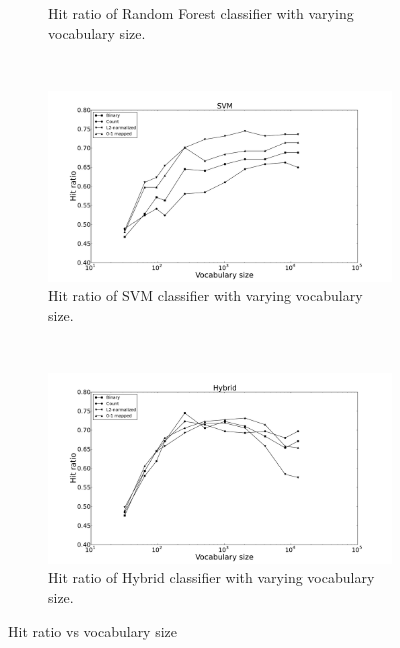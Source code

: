 \begin{figure}[H]
\begin{subfigure}[b]{\figwidth}
		\caption{Hit ratio of Random Forest classifier with varying vocabulary size.}
		\label{fig:hitratio-rf}
	\end{subfigure}
	~
	\begin{subfigure}[b]{\figwidth}
		\includegraphics[width=\textwidth]{img/SVM-hitrate-eps-converted-to.pdf}
		\caption{Hit ratio of SVM classifier with varying vocabulary size.}
		\label{fig:hitratio-svm}
	\end{subfigure}
	\\
	\begin{subfigure}[b]{\figwidth}
		\includegraphics[width=\textwidth]{img/Hybrid-hitrate-eps-converted-to.pdf}
		\caption{Hit ratio of Hybrid classifier with varying vocabulary size.}
		\label{fig:hitratio-hybrid}
	\end{subfigure}
	\caption{Hit ratio vs vocabulary size}
	\label{fig:hitratio}
\end{figure}

